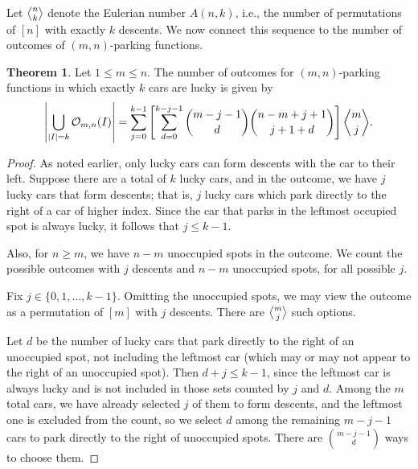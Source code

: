 \documentclass[reqno]{amsart}
\theoremstyle{definition}
\newtheorem{theorem}{Theorem}[section]
\theoremstyle{remark}
\newcommand{\out}{\mathcal{O}}
\begin{document}
Let $\genfrac{\langle}{\rangle}{0pt}{}{n}{k}$ denote the Eulerian number $A(n,k)$, i.e., the number of permutations of $[n]$ with exactly $k$ descents. We now connect this sequence to the number of outcomes of $(m,n)$-parking functions.

\begin{theorem}\label{thm:mn pf with k lucky}
    Let $1\leq m \leq n $. The number of outcomes for $(m,n)$-parking functions in which exactly $k$ cars are lucky is given by
    \[   \left|\bigcup_{|I|=k}\out_{m,n}(I) \right|=\sum_{j=0}^{k-1} \left[\sum_{d=0}^{k-j-1} \binom{m-j-1}{d}  \binom{n-m+j+1}{j+1+d}\right] \genfrac{\langle}{\rangle}{0pt}{}{m}{j}.
    \]
\end{theorem}

\begin{proof}
As noted earlier, only lucky cars can form descents with the car to their left. Suppose there are a total of $k$ lucky cars, and in the outcome, we have $j$ lucky cars that form descents; that is, $j$ lucky cars which park directly to the right of a car of higher index. Since the car that parks in the leftmost occupied spot is always lucky, it follows that $j\leq k-1$.

Also, for $n\geq m$, we have $n-m$ unoccupied spots in the outcome. We count the possible outcomes with $j$ descents and $n-m$ unoccupied spots, for all possible $j$.

Fix $j \in \{0,1,\ldots, k-1\}$. Omitting the unoccupied spots, we may view the outcome as a  permutation of $[m]$ with $j$ descents. There are $\genfrac{\langle}{\rangle}{0pt}{}{m}{j}$ such options.

Let $d$ be the number of lucky cars that park directly to the right of an unoccupied spot, not including the leftmost car (which may or may not appear to the right of an unoccupied spot). Then $d+j \leq k-1$, since the leftmost car is always lucky and is not included in those sets counted by $j$ and $d$. 
Among the $m$ total cars, we have already selected $j$ of them to form descents, and the leftmost one is excluded from the count, so we select $d$ among the remaining $m-j-1$ cars to park directly to the right of unoccupied spots. There are $\binom{m-j-1}{d}$ ways to choose them. 


\end{proof}
\end{document}
